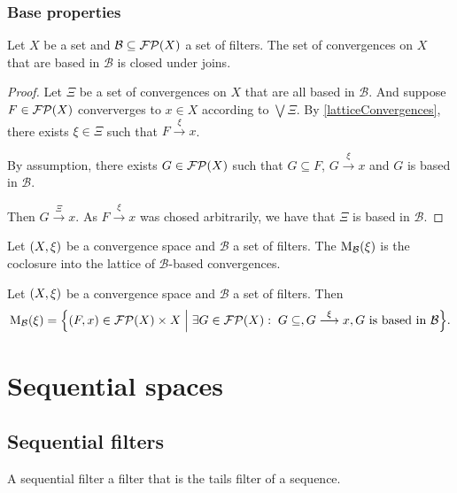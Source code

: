 \subsection{Base properties}
\label{baseModificationConvergence}
\begin{lemma}
Let $X$ be a set and $\mathcal{B}\subseteq \operatorname{\mathcal{FP}}(X)$ a set of filters. The set of convergences on $X$ that are based in $\mathcal{B}$ is closed under joins.
\end{lemma}
\begin{proof}
Let $\Xi$ be a set of convergences on $X$ that are all based in $\mathcal{B}$. And suppose $F\in\operatorname{\mathcal{FP}}(X)$ conververges to $x\in X$ according to $\bigvee \Xi$. By \ref{latticeConvergences}, there exists $\xi\in \Xi$ such that $F\overset{\xi}{\longrightarrow} x$.

By assumption, there exists $G\in\operatorname{\mathcal{FP}}(X)$ such that $G\subseteq F$, $G\overset{\xi}{\longrightarrow} x$ and $G$ is based in $\mathcal{B}$.

Then $G\overset{\Xi}{\longrightarrow} x$. As $F\overset{\xi}{\longrightarrow} x$ was chosed arbitrarily, we have that $\Xi$ is based in $\mathcal{B}$.
\end{proof}

\begin{definition}
Let $\sSet{X, \xi}$ be a convergence space and $\mathcal{B}$ a set of filters. The  $\operatorname{M}_\mathcal{B}(\xi)$ is the coclosure into the lattice of $\mathcal{B}$-based convergences.
\end{definition}

\begin{lemma}
Let $\sSet{X, \xi}$ be a convergence space and $\mathcal{B}$ a set of filters. Then
\[ \basedMod_\mathcal{B}(\xi) = \setbuilder{(F,x)\in \powerfilters(X)\times X}{\exists G\in \powerfilters(X): \; G\subseteq, G\overset{\xi}{\longrightarrow} x, \text{$G$ is based in $\mathcal{B}$}}. \]
\end{lemma}




\chapter{Sequential spaces}

\section{Sequential filters}
A sequential filter a filter that is the tails filter of a sequence.

